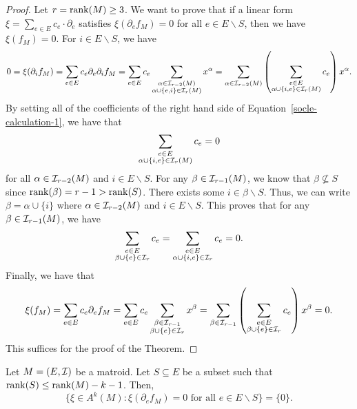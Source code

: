 \documentclass{puthesis-UG}
\begin{document}
\begin{proof}
	Let $r = \operatorname{rank} (M) \geq 3$. We want to prove that if a linear form $\xi = \sum_{e \in E} c_e \cdot \partial_e$ satisfies $\xi (\partial_e f_M) = 0$ for all $e \in E \backslash S$, then we have $\xi (f_M) = 0$. For $i \in E \backslash S$, we have 
	\begin{equation} \label{socle-calculation-1}
		0 = \xi (\partial_i f_M) = \sum_{e \in E} c_e \partial_e \partial_i f_M = \sum_{e \in E} c_e \sum_{\substack{\alpha \in \mathcal{I}_{r-2}(M) \\ \alpha \cup \{e,i\} \in \mathcal{I}_r (M)}} x^\alpha = \sum_{\alpha \in \mathcal{I}_{r-2}(M)} \left ( \sum_{\substack{e \in E \\ \alpha \cup \{i, e\} \in \mathcal{I}_r(M)}} c_e \right ) x^\alpha. 
	\end{equation}
	By setting all of the coefficients of the right hand side of Equation~\ref{socle-calculation-1}, we have that 
	\[
		\sum_{\substack{e \in E \\ \alpha \cup \{i, e\} \in \mathcal{I}_r (M)}} c_e = 0
	\]
	for all $\alpha \in \mathcal{I}_{r-2}(M)$ and $i \in E \backslash S$. For any $\beta \in \mathcal{I}_{r-1}(M)$, we know that $\beta \not \subseteq S$ since $\operatorname{rank} (\beta) = r-1 > \operatorname{rank} (S)$. There exists some $i \in \beta \backslash S$. Thus, we can write $\beta = \alpha \cup \{i\}$ where $\alpha \in \mathcal{I}_{r-2}(M)$ and $i \in E \backslash S$. This proves that for any $\beta \in \mathcal{I}_{r-1}(M)$, we have
	\[
		\sum_{\substack{e \in E \\ \beta \cup \{e\} \in \mathcal{I}_{r}}} c_e = \sum_{\substack{e \in E \\ \alpha \cup \{i, e\} \in \mathcal{I}_{r}}} c_e = 0.
	\]
	Finally, we have that 
	\[
		\xi(f_M) = \sum_{e \in E} c_e \partial_e f_M = \sum_{e \in E} c_e \sum_{\substack{\beta \in \mathcal{I}_{r-1} \\ \beta \cup \{e\} \in \mathcal{I}_r}} x^\beta = \sum_{\beta \in \mathcal{I}_{r-1}} \left ( \sum_{\substack{e \in E \\ \beta \cup \{e\} \in \mathcal{I}_r}} c_e \right ) x^\beta = 0.
	\]
	This suffices for the proof of the Theorem. 
\end{proof}

\begin{thm} \label{higher-degree-socles}
	Let $M = (E, \mathcal{I})$ be a matroid. Let $S \subseteq E$ be a subset such that $\operatorname{rank}(S) \leq \operatorname{rank}(M) - k - 1$. Then, 
	\[
		\{\xi \in A^k(M) : \xi (\partial_e f_M) = 0 \text{ for all } e \in E \backslash S\} = \{0\}.
	\]
\end{thm}
\end{document}
